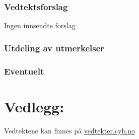 \documentclass[10pt,norsk,a4paper,usenames,dvipsnames]{article}
\begin{document}
\newpage

\section{Vedtektsforslag}

    Ingen innsendte forslag


\section{Utdeling av utmerkelser}


\section{Eventuelt}


\part*{Vedlegg:}\label{lastpage}

    \centering\huge Vedtektene kan finnes på \href{vedtekter.cyb.no}{vedtekter.cyb.no}


% 
\end{document}
